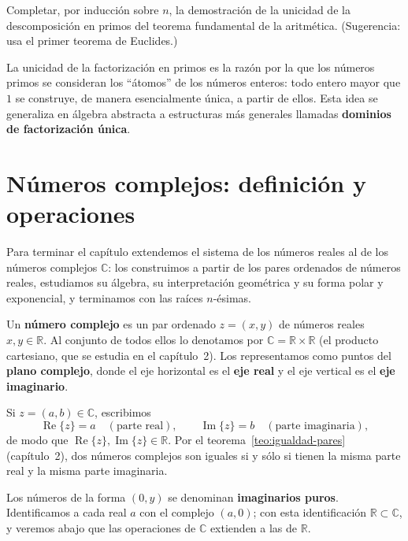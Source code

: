 \documentclass[12pt,a4paper]{book}
\DeclareMathOperator{\Real}{Re}
\DeclareMathOperator{\Imag}{Im}
\begin{document}
  \begin{ejemplo}
    Completar, por inducción sobre $n$, la demostración de la unicidad de la descomposición en primos del teorema fundamental de la aritmética. (Sugerencia: usa el primer teorema de Euclides.)
  \end{ejemplo}
  
  La unicidad de la factorización en primos es la razón por la que los números primos se consideran los ``átomos'' de los números enteros: todo entero mayor que $1$ se construye, de manera esencialmente única, a partir de ellos. Esta idea se generaliza en álgebra abstracta a estructuras más generales llamadas \textbf{dominios de factorización única}.

  \section{Números complejos: definición y operaciones}

  Para terminar el capítulo extendemos el sistema de los números reales al de los números complejos $\mathbb{C}$: los construimos a partir de los pares ordenados de números reales, estudiamos su álgebra, su interpretación geométrica y su forma polar y exponencial, y terminamos con las raíces $n$-ésimas.

  \begin{definicion}
    Un \textbf{número complejo} es un par ordenado $z=(x,y)$ de números reales $x,y\in\mathbb{R}$. Al conjunto de todos ellos lo denotamos por $\mathbb{C}=\mathbb{R}\times\mathbb{R}$ (el producto cartesiano, que se estudia en el capítulo~2). Los representamos como puntos del \textbf{plano complejo}, donde el eje horizontal es el \textbf{eje real} y el eje vertical es el \textbf{eje imaginario}.
  \end{definicion}

  Si $z=(a,b)\in\mathbb{C}$, escribimos
  \begin{equation*}
    \Real\{z\}=a \quad (\text{parte real}), \qquad \Imag\{z\}=b \quad (\text{parte imaginaria}),
  \end{equation*}
  de modo que $\Real\{z\},\Imag\{z\}\in\mathbb{R}$. Por el teorema~\ref{teo:igualdad-pares} (capítulo~2), dos números complejos son iguales si y sólo si tienen la misma parte real y la misma parte imaginaria.

  Los números de la forma $(0,y)$ se denominan \textbf{imaginarios puros}. Identificamos a cada real $a$ con el complejo $(a,0)$; con esta identificación $\mathbb{R}\subset\mathbb{C}$, y veremos abajo que las operaciones de $\mathbb{C}$ extienden a las de $\mathbb{R}$.
\end{document}
